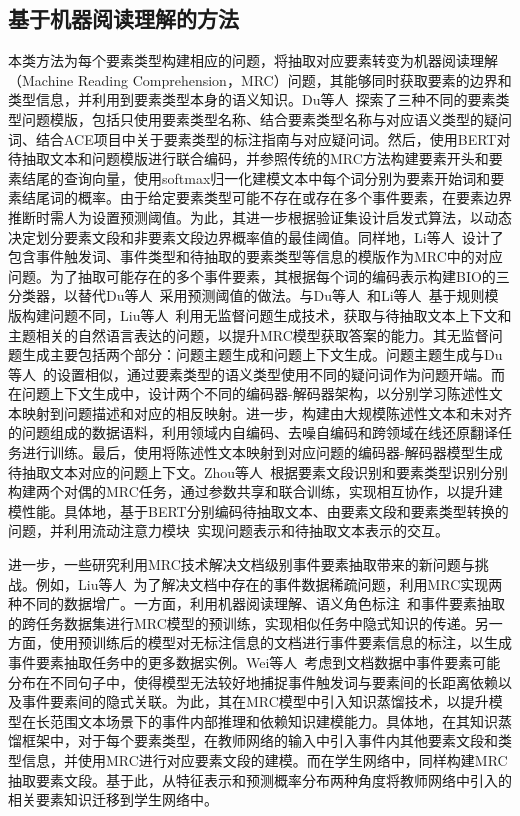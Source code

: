 \subsection{基于机器阅读理解的方法}

本类方法为每个要素类型构建相应的问题，将抽取对应要素转变为机器阅读理解（Machine Reading Comprehension，MRC）\cite{rajpurkar2016squad}问题，其能够同时获取要素的边界和类型信息，并利用到要素类型本身的语义知识。Du等人~\cite{du2020event}探索了三种不同的要素类型问题模版，包括只使用要素类型名称、结合要素类型名称与对应语义类型的疑问词、结合ACE项目中关于要素类型的标注指南与对应疑问词。然后，使用BERT对待抽取文本和问题模版进行联合编码，并参照传统的MRC方法构建要素开头和要素结尾的查询向量，使用softmax归一化建模文本中每个词分别为要素开始词和要素结尾词的概率。由于给定要素类型可能不存在或存在多个事件要素，在要素边界推断时需人为设置预测阈值。为此，其进一步根据验证集设计启发式算法，以动态决定划分要素文段和非要素文段边界概率值的最佳阈值。同样地，Li等人~\cite{li2020event}设计了包含事件触发词、事件类型和待抽取的要素类型等信息的模版作为MRC中的对应问题。为了抽取可能存在的多个事件要素，其根据每个词的编码表示构建BIO的三分类器，以替代Du等人~\cite{du2020event}采用预测阈值的做法。与Du等人~\cite{du2020event}和Li等人~\cite{li2020event}基于规则模版构建问题不同，Liu等人~\cite{liu2020event}利用无监督问题生成技术，获取与待抽取文本上下文和主题相关的自然语言表达的问题，以提升MRC模型获取答案的能力。其无监督问题生成主要包括两个部分：问题主题生成和问题上下文生成。问题主题生成与Du等人~\cite{du2020event}的设置相似，通过要素类型的语义类型使用不同的疑问词作为问题开端。而在问题上下文生成中，设计两个不同的编码器-解码器架构，以分别学习陈述性文本映射到问题描述和对应的相反映射。进一步，构建由大规模陈述性文本和未对齐的问题组成的数据语料，利用领域内自编码、去噪自编码和跨领域在线还原翻译任务进行训练。最后，使用将陈述性文本映射到对应问题的编码器-解码器模型生成待抽取文本对应的问题上下文。Zhou等人~\cite{zhou2021role}根据要素文段识别和要素类型识别分别构建两个对偶的MRC任务，通过参数共享和联合训练，实现相互协作，以提升建模性能。具体地，基于BERT分别编码待抽取文本、由要素文段和要素类型转换的问题，并利用流动注意力模块~\cite{seo2016bidirectional}实现问题表示和待抽取文本表示的交互。

进一步，一些研究利用MRC技术解决文档级别事件要素抽取带来的新问题与挑战。例如，Liu等人~\cite{liu2021machine}为了解决文档中存在的事件数据稀疏问题，利用MRC实现两种不同的数据增广。一方面，利用机器阅读理解、语义角色标注~\cite{atkins2003contribution}和事件要素抽取的跨任务数据集进行MRC模型的预训练，实现相似任务中隐式知识的传递。另一方面，使用预训练后的模型对无标注信息的文档进行事件要素信息的标注，以生成事件要素抽取任务中的更多数据实例。Wei等人~\cite{wei2021trigger}考虑到文档数据中事件要素可能分布在不同句子中，使得模型无法较好地捕捉事件触发词与要素间的长距离依赖以及事件要素间的隐式关联。为此，其在MRC模型中引入知识蒸馏技术，以提升模型在长范围文本场景下的事件内部推理和依赖知识建模能力。具体地，在其知识蒸馏框架中，对于每个要素类型，在教师网络的输入中引入事件内其他要素文段和类型信息，并使用MRC进行对应要素文段的建模。而在学生网络中，同样构建MRC抽取要素文段。基于此，从特征表示和预测概率分布两种角度将教师网络中引入的相关要素知识迁移到学生网络中。

